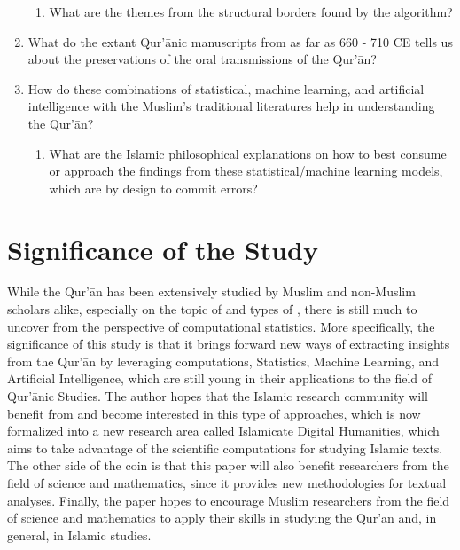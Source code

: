 \begin{enumerate}
\begin{enumerate}
        \item What are the themes from the structural borders found by the algorithm?
    \end{enumerate}
    \item What do the extant Qur'\=anic manuscripts from as far as 660 - 710 CE tells us about the preservations of the oral transmissions of the Qur'\=an?
    
    \item How do these combinations of statistical, machine learning, and artificial intelligence with the Muslim's traditional literatures help in understanding the Qur'\=an?
    \begin{enumerate}
        \item What are the Islamic philosophical explanations on how to best consume or approach the findings from these statistical/machine learning models, which are by design to commit errors?
    \end{enumerate}
\end{enumerate}

\section{Significance of the Study}\label{sec:significance}
While the Qur'\=an has been extensively studied by Muslim and non-Muslim scholars alike, especially on the topic of   and   types of  , there is still much to uncover from the perspective of computational statistics. More specifically, the significance of this study is that it brings forward new ways of extracting insights from the Qur'\=an by leveraging computations, Statistics, Machine Learning, and Artificial Intelligence, which are still young in their applications to the field of Qur'\=anic Studies. The author hopes that the Islamic research community will benefit from and become interested in this type of approaches, which is now formalized into a new research area called Islamicate Digital Humanities, which aims to take advantage of the scientific computations for studying Islamic texts. The other side of the coin is that this paper will also benefit researchers from the field of science and mathematics, since it provides new methodologies for textual analyses. Finally, the paper hopes to encourage Muslim researchers from the field of science and mathematics to apply their skills in studying the Qur'\=an and, in general, in Islamic studies.

